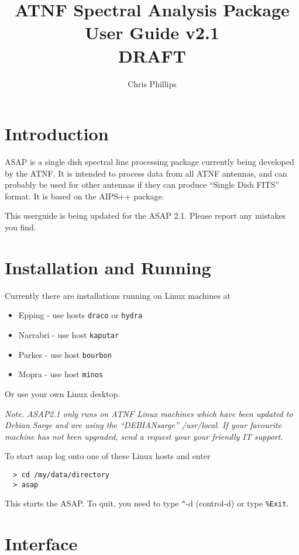 \documentclass[11pt]{article}
\title{ATNF Spectral Analysis Package\\User Guide v2.1\\DRAFT }
\author{Chris Phillips}
\newcommand{\cmd}[1]{{\tt #1}}
\begin{document}
\maketitle

\section{Introduction}

ASAP is a single dish spectral line processing package currently being
developed by the ATNF. It is intended to process data from all ATNF
antennas, and can probably be used for other antennas if they can
produce ``Single Dish FITS'' format. It is based on the AIPS++
package.

This userguide is being updated for the ASAP 2.1. Please report any
mistakes you find.

\section{Installation and Running}

Currently there are installations running on Linux machines at

\begin{itemize}
\item Epping - use hosts {\tt draco} or {\tt hydra}
\item Narrabri - use host {\tt kaputar}
\item Parkes - use host {\tt bourbon}
\item Mopra - use host {\tt minos}
\end{itemize}

Or use your own Linux desktop.

{\em Note. ASAP2.1 only runs on ATNF Linux machines which have been
updated to Debian Sarge and are using the ``DEBIANsarge''
/usr/local. If your favourite machine has not been upgraded, send a
request your your friendly IT support.}

To start asap log onto one of these Linux hosts and enter

\begin{verbatim}
  > cd /my/data/directory
  > asap
\end{verbatim}

This starts the ASAP. To quit, you need to type \verb+^+-d
(control-d) or type \cmd{\%Exit}.

\section{Interface}
\end{document}
